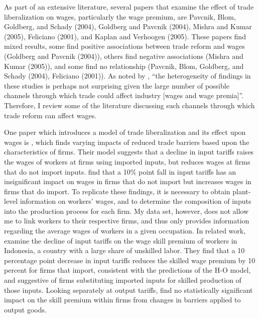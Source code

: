 \documentclass[12pt]{article}
\begin{document}
As part of an extensive literature, several papers that examine the effect of trade liberalization on 
wages, particularly the wage premium, are Pavcnik, Blom, Goldberg, and Schady (2004), Goldberg
and Pavcnik (2004), Mishra and Kumar (2005), Feliciano (2001), and Kaplan and Verhoogen (2005).
These papers find mixed results, some find positive associations between trade reform and wages 
(Goldberg and Pavcnik (2004)), others find negative associations (Mishra and Kumar (2005)), and some 
find no relationship (Pavcnik, Blom, Goldberg, and Schady (2004), Feliciano (2001)). As noted by 
\citet{goldberg}, ``the heterogeneity of findings in these studies is perhaps not surprising 
given the large number of possible channels through which trade could affect industry [wages 
and wage premia]''. Therefore, I review some of the literature discussing such channels through
which trade reform can affect wages.

One paper which introduces a model of trade liberalization and its effect upon wages is \citet{amiti},
which finds varying impacts of reduced trade barriers based upon the characteristics of
firms. Their model suggests that a decline in input tariffs raises the wages of workers at firms
using imported inputs, but reduces wages at firms that do not import inputs. 
\citeauthor{amiti} find that a 10\% point fall in input tariffs has an insignificant impact
on wages in firms that do not import but increases wages in firms that do import. 
To replicate these findings, it is necessary to obtain plant-level information on workers'
wages, and to determine the composition of inputs into the production process for each firm.
My data set, however, does not allow me to link workers to their respective firms, and thus only
provides information regarding the average wages of workers in a given occupation. 
In related work, \citet{amiti2012trade} examine the decline of input tariffs on the wage skill
premium of workers in Indonesia, a country with a large share of unskilled labor.
They find that a 10 percentage point decrease in input tariffs reduces the skilled wage premium
by 10 percent for firms that import, consistent with the predictions of the H-O model, and suggestive
of firms substituting imported inputs for skilled production of those inputs. Looking separately at
output tariffs, \citeauthor{amiti2012trade} find no statistically significant impact on the 
skill premium within firms from changes in barriers applied to output goods.
\end{document}

